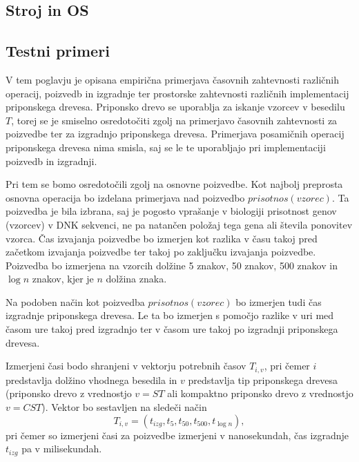 \subsection{Stroj in OS}

\subsection{Testni primeri}

V tem poglavju je opisana empirična primerjava časovnih zahtevnosti različnih operacij, poizvedb in izgradnje ter prostorske zahtevnosti različnih implementacij priponskega drevesa. Priponsko drevo se uporablja za iskanje vzorcev v besedilu $T$, torej se je smiselno osredotočiti zgolj na primerjavo časovnih zahtevnosti za poizvedbe ter za izgradnjo priponskega drevesa. Primerjava posamičnih operacij priponskega drevesa nima smisla, saj se le te uporabljajo pri implementaciji poizvedb in izgradnji. 

Pri tem se bomo osredotočili zgolj na osnovne poizvedbe. Kot najbolj preprosta osnovna operacija bo izdelana primerjava nad poizvedbo $prisotnos(vzorec)$. Ta poizvedba je bila izbrana, saj je pogosto vprašanje v biologiji prisotnost genov (vzorcev) v DNK sekvenci, ne pa natančen položaj tega gena ali števila ponovitev vzorca. Čas izvajanja poizvedbe bo izmerjen kot razlika v času takoj pred začetkom izvajanja poizvedbe ter takoj po zaključku izvajanja poizvedbe. Poizvedba bo izmerjena na vzorcih dolžine 5 znakov, 50 znakov, 500 znakov in $\log{n}$ znakov, kjer je $n$ dolžina znaka. 

Na podoben način kot poizvedba $prisotnos(vzorec)$ bo izmerjen tudi čas izgradnje priponskega drevesa. Le ta bo izmerjen s pomočjo razlike v uri med časom ure takoj pred izgradnjo ter v časom ure takoj po izgradnji priponskega drevesa.

Izmerjeni časi bodo shranjeni v vektorju potrebnih časov $T_{i,v}$, pri čemer $i$ predstavlja dolžino vhodnega besedila in $v$ predstavlja tip priponskega drevesa (priponsko drevo z vrednostjo $v=ST$ ali kompaktno priponsko drevo z vrednostjo $v=CST$). Vektor bo sestavljen na sledeči način
\begin{equation*}
    T_{i,v}=(t_{izg},t_5,t_{50},t_{500},t_{\log{n}}),
\end{equation*}
pri čemer so izmerjeni časi za poizvedbe izmerjeni v nanosekundah, čas izgradnje $t_{izg}$ pa v milisekundah. 

